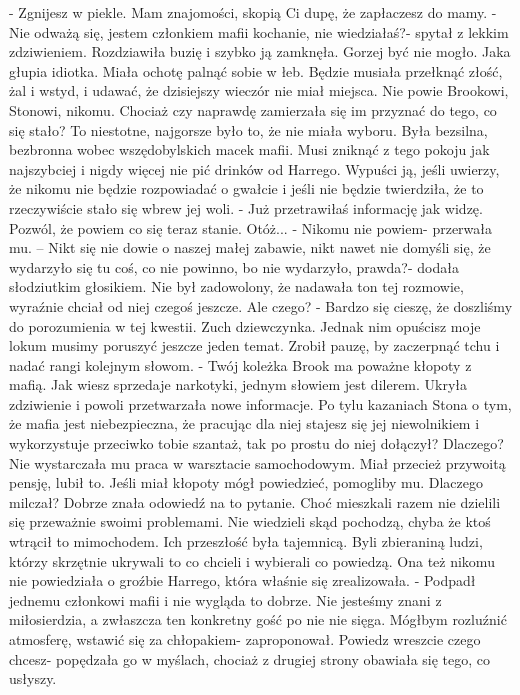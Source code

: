 \documentclass[12pt,a4paper]{book}
\begin{document}
- Zgnijesz w piekle. Mam znajomości, skopią Ci dupę, że zapłaczesz do mamy.
- Nie odważą się, jestem członkiem mafii kochanie, nie wiedziałaś?- spytał z lekkim zdziwieniem.
Rozdziawiła buzię i szybko ją zamknęła. Gorzej być nie mogło. Jaka głupia idiotka. Miała ochotę palnąć sobie w łeb. Będzie musiała przełknąć złość, żal i wstyd, i udawać, że dzisiejszy wieczór nie miał miejsca. Nie powie Brookowi, Stonowi, nikomu. Chociaż czy naprawdę zamierzała się im przyznać do tego, co się stało? To niestotne, najgorsze było to, że nie miała wyboru. Była bezsilna, bezbronna wobec wszędobylskich macek mafii. Musi zniknąć z tego pokoju jak najszybciej i nigdy więcej nie pić drinków od Harrego. Wypuści ją, jeśli uwierzy, że nikomu nie będzie rozpowiadać o gwałcie i jeśli nie będzie twierdziła, że to rzeczywiście stało się wbrew jej woli.
- Już przetrawiłaś informację jak widzę. Pozwól, że powiem co się teraz stanie. Otóż...
- Nikomu nie powiem- przerwała mu. – Nikt się nie dowie o naszej małej zabawie, nikt nawet nie domyśli się, że wydarzyło się tu coś, co nie powinno, bo nie wydarzyło, prawda?- dodała słodziutkim głosikiem. 
Nie był zadowolony, że nadawała ton tej rozmowie, wyraźnie chciał od niej czegoś jeszcze. Ale czego?
- Bardzo się cieszę, że doszliśmy do porozumienia w tej kwestii. Zuch dziewczynka. Jednak nim opuścisz moje lokum musimy poruszyć jeszcze jeden temat. 
Zrobił pauzę, by zaczerpnąć tchu i nadać rangi kolejnym słowom.
- Twój koleżka Brook ma poważne kłopoty z mafią. Jak wiesz sprzedaje narkotyki, jednym słowiem jest dilerem.
Ukryła zdziwienie i powoli przetwarzała nowe informacje. Po tylu kazaniach Stona o tym, że mafia jest niebezpieczna, że pracując dla niej stajesz się jej niewolnikiem i wykorzystuje przeciwko tobie szantaż, tak po prostu do niej dołączył? Dlaczego? Nie wystarczała mu praca w warsztacie samochodowym. Miał przecież przywoitą pensję, lubił to. Jeśli miał kłopoty mógł powiedzieć, pomogliby mu. Dlaczego milczał? Dobrze znała odowiedź na to pytanie. Choć mieszkali razem nie dzielili się przeważnie swoimi problemami. Nie wiedzieli skąd pochodzą, chyba że ktoś wtrącił to mimochodem. Ich przeszłość była tajemnicą. Byli zbieraniną ludzi, którzy skrzętnie ukrywali to co chcieli i wybierali co powiedzą. Ona też nikomu nie powiedziała o groźbie Harrego, która właśnie się zrealizowała. 
- Podpadł jednemu członkowi mafii i nie wygląda to dobrze. Nie jesteśmy znani z miłosierdzia, a zwłaszcza ten konkretny gość po nie nie sięga. Mógłbym rozluźnić atmosferę, wstawić się za chłopakiem- zaproponował. 
Powiedz wreszcie czego chcesz- popędzała go w myślach, chociaż z drugiej strony obawiała się tego, co usłyszy. 
\end{document}
